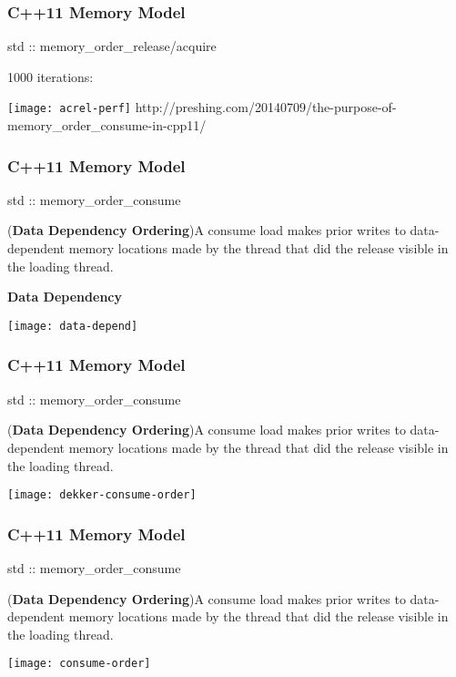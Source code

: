 \begin{frame}
    \frametitle{C++11 Memory Model}
    \LARGE
    std :: memory\_order\_release/acquire
    
    1000 iterations:
    
    \texttt{[image: acrel-perf]}
    \tiny
    http://preshing.com/20140709/the-purpose-of-memory\_order\_consume-in-cpp11/
    
\end{frame}

\begin{frame}
    \frametitle{C++11 Memory Model}
    \LARGE
    std :: memory\_order\_consume
    
    
    \normalsize
    (\textbf{Data Dependency Ordering})A consume load makes prior writes to data-dependent memory
    locations made by the thread that did the release visible in the
    loading thread.
    
    \LARGE
    \centering
    \textbf{Data Dependency}
    
    \texttt{[image: data-depend]}
    

\end{frame}


\begin{frame}
    \frametitle{C++11 Memory Model}
    \LARGE
    std :: memory\_order\_consume
    
    
    \normalsize
    (\textbf{Data Dependency Ordering})A consume load makes prior writes to data-dependent memory
    locations made by the thread that did the release visible in the
    loading thread.
    
    \texttt{[image: dekker-consume-order]}
\end{frame}


\begin{frame}
    \frametitle{C++11 Memory Model}
    \LARGE
    std :: memory\_order\_consume
    
    
    \normalsize
    (\textbf{Data Dependency Ordering})A consume load makes prior writes to data-dependent memory
    locations made by the thread that did the release visible in the
    loading thread.
    
    \texttt{[image: consume-order]}
\end{frame}


